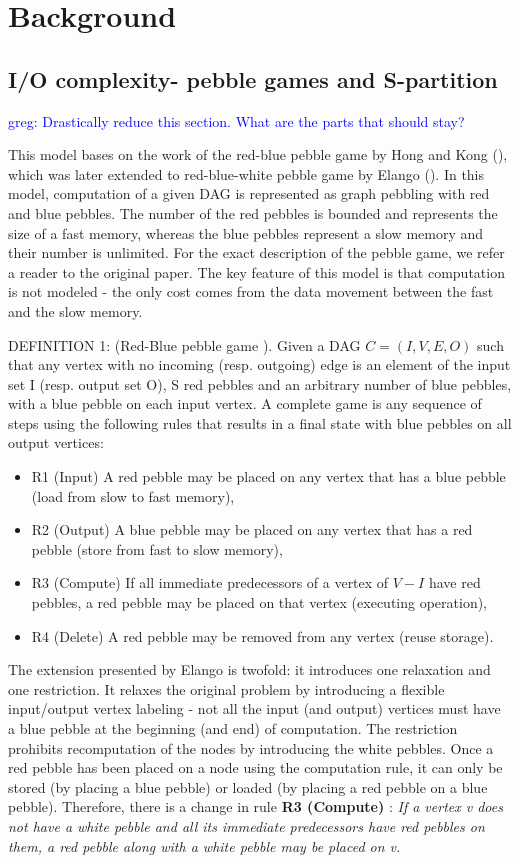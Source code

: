 \documentclass[sigconf]{acmart}
\newcommand\greg[1]{\textcolor{blue}{greg: #1}}
\begin{document}
	\section{Background}
	\subsection{I/O complexity- pebble games and S-partition}
	\label{sec:background}
	\greg{Drastically reduce this section. What are the parts that should stay?}
	
	This model bases on the work of the red-blue pebble game by Hong and Kong 
	(\cite{redblue}), which was later extended to red-blue-white pebble game by 
	Elango (\cite{redbluewhite}). In this model, computation of a given DAG is 
	represented as graph 
	pebbling with red and blue pebbles. The number of the red pebbles is 
	bounded and represents the size of a fast memory, whereas the blue pebbles 
	represent a slow memory and their number is unlimited. For the exact 
	description of the pebble game, we refer a reader to the original paper. 
	The key feature of this model is that computation is not modeled - the only 
	cost comes from the data movement between the fast and the slow memory. 
	
	DEFINITION 1: (Red-Blue pebble game \cite{redblue}).
	Given a DAG $C = (I,V,E,O)$
	such that any vertex with no incoming (resp.
	outgoing) edge is an element of the input set I (resp. output set O), S red 
	pebbles and
	an arbitrary number of blue pebbles, with a blue pebble on
	each input vertex. A complete game is any sequence of steps
	using the following rules that results in a final state with blue
	pebbles on all output vertices:
	\begin{itemize}
		\item R1 (Input)
		A red pebble may be placed on any vertex that has
		a blue pebble (load from slow to fast memory),
		\item R2 (Output)
		A blue pebble may be placed on any vertex that
		has a red pebble (store from fast to slow memory),
		\item R3 (Compute)
		If all immediate predecessors of a vertex of
		$V - I$ have red pebbles, a red pebble may be placed on that
		vertex (executing operation),
		\item R4 (Delete)
		A red pebble may be removed from any vertex
		(reuse storage).
	\end{itemize}
	
	
	The extension presented by Elango is twofold: it introduces one relaxation 
	and one restriction. It relaxes the original problem by introducing a 
	flexible input/output vertex labeling - not all the input (and output) 
	vertices must have a blue pebble at the beginning (and end) of computation.
	The restriction prohibits recomputation of the nodes by introducing the 
	white pebbles. Once a red pebble has been placed on a node using the 
	computation rule, it can only be stored (by placing a blue pebble) or 
	loaded (by placing a red pebble on a blue pebble). Therefore, there is a 
	change in rule \textbf{R3 (Compute)} : \textit{If a vertex v does not have 
		a white pebble and
		all its immediate predecessors have red pebbles on them, a
		red pebble along with a white pebble may be placed on v.}
	
\end{document}
